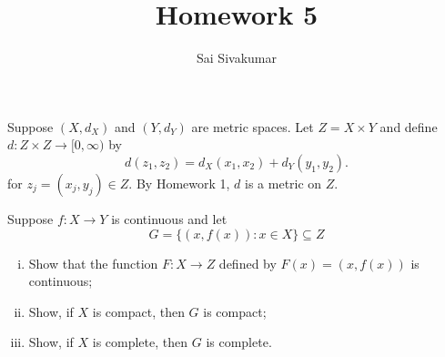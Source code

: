 \documentclass[12pt]{amsart}
\title{Homework 5}
\author{Sai Sivakumar}
\begin{document}
\maketitle

Suppose $(X,d_X)$ and $(Y,d_Y)$ are metric spaces.
 Let $Z=X\times Y$ and define $d:Z\times Z\to [0,\infty)$ by
\[
  d(z_1,z_2)= d_X(x_1,x_2)+d_Y(y_1,y_2).
\]
for  $z_j=(x_j,y_j) \in Z.$ By Homework 1, 
 $d$ is a metric on $Z.$  


\bigskip

Suppose $f:X\to Y$ is continuous and let
\[
G=\{(x,f(x)):x\in X\}\subseteq Z
\]


\begin{enumerate}[(i)] \itemsep=8pt
 \item Show that the function $F:X\to Z$ defined by $F(x)=(x,f(x))$
 is continuous;
 \item Show, if $X$ is compact, then $G$  is compact;
 \item Show, if $X$ is complete, then $G$ is complete.
\end{enumerate}
\end{document}
